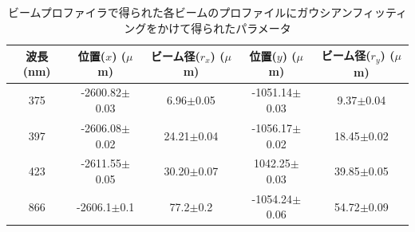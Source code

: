 \begin{table}[h]
	\begin{center}
		\caption{ビームプロファイラで得られた各ビームのプロファイルにガウシアンフィッティングをかけて得られたパラメータ}
		\label{tab:GaussianFitting}
		\begin{tabular}{c|cc|cc} \hline \hline
			波長 (nm)&位置($x$) ($\mu$m)&ビーム径($r_x$) ($\mu$m) &位置($y$) ($\mu$m)& ビーム径($r_y$) ($\mu$m)\\ \hline
			375&-2600.82$\pm$0.03&6.96$\pm$0.05&-1051.14$\pm$0.03&9.37$\pm$0.04 \\
			397&-2606.08$\pm$0.02&24.21$\pm$0.04&-1056.17$\pm$0.02&18.45$\pm$0.02 \\
			423&-2611.55$\pm$0.05&30.20$\pm$0.07&1042.25$\pm$0.03&39.85$\pm$0.05 \\
			866&-2606.1$\pm$0.1&77.2$\pm$0.2&-1054.24$\pm$0.06&54.72$\pm$0.09 \\\hline
		\end{tabular}
	\end{center}
\end{table}

\clearpage


